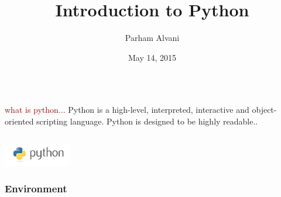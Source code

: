\documentclass{beamer}
\title[Introduction]{Introduction to Python}
\author{Parham Alvani}
\institute[AUT] {
  Amirkabir University of Technology \\
  \medskip
  {\small\tt parham.alvani@gmail.com}
}
\date{May 14, 2015}
\begin{document}
\begin{frame}
\titlepage
\end{frame}


\section{}
\subsection{}

\begin{frame}
\begin{columns}
	\begin{column}{10cm}
		\vspace{2cm}
		\begin{block}{
				\centering\textcolor{darkred}{what is python...}}
				\justifying
				Python is a high-level, interpreted, interactive and object-oriented scripting language. Python is designed to be highly readable..\\
		\end{block}
	\end{column}
\end{columns}
\vspace{.75cm}
\hspace*{8.5cm}\includegraphics[width=3cm]{figs/python.jpeg}
\end{frame}

\begin{frame}
	\frametitle{Environment}
\end{frame}
\end{document}
